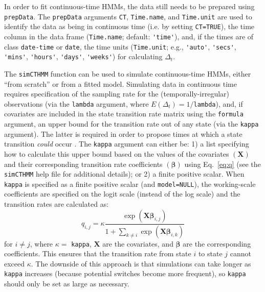 \documentclass[12pt]{article}\usepackage[]{graphicx}\usepackage[]{xcolor}
\begin{document}
In order to fit continuous-time HMMs, the data still needs to be prepared using \verb|prepData|. The \verb|prepData| arguments \verb|CT|, \verb|Time.name|, and \verb|Time.unit| are used to identify the data as being in continuous time (i.e. by setting \verb|CT=TRUE|), the time column in the data frame (\verb|Time.name|; default: \verb|'time'|), and, if the times are of class \verb|date-time| or \verb|date|, the time units (\verb|Time.unit|; e.g., \verb|'auto'|, \verb|'secs'|, \verb|'mins'|, \verb|'hours'|, \verb|'days'|, \verb|'weeks'|) for calculating $\Delta_t$.

The \verb|simCTHMM| function can be used to simulate continuous-time HMMs, either ``from scratch'' or from a fitted model. Simulating data in continuous time requires specification of the sampling rate for the (temporally-irregular) observations (via the \verb|lambda| argument, where $E(\Delta_t)=1/$\verb|lambda|), and, if covariates are included in the state transition rate matrix using the \verb|formula| argument, an upper bound for the transition rate out of any state (via the \verb|kappa| argument). The latter is required in order to propose times at which a state transition {\it could} occur \citep[][]{BlackwellEtAl2016,McClintockLander2024}. The \verb|kappa| argument can either be: 1) a list specifying how to calculate this upper bound based on the values of the covariates $(\mathbf{X})$ and their corresponding transition rate coefficients $(\boldsymbol{\beta})$ using Eq.\ \ref{eq:q} (see the \verb|simCTHMM| help file for additional details); or 2) a finite positive scalar. When \verb|kappa| is specified as a finite positive scalar (and \verb|model=NULL|), the working-scale coefficients are specified on the logit scale (instead of the log scale) and the transition rates are calculated as:
\begin{equation}
\label{eq:kappa}
 q_{i,j} = \kappa \frac{\exp(\mathbf{X}\boldsymbol{\beta}_{i,j})}{1+\sum_{k \ne i}\exp(\mathbf{X}\boldsymbol{\beta}_{i,k})}
\end{equation}
for $i \ne j$, where $\kappa=$ \verb|kappa|, $\mathbf{X}$ are the covariates, and $\boldsymbol{\beta}$ are the corresponding coefficients. This ensures that the transition rate from state $i$ to state $j$ cannot exceed $\kappa$. The downside of this approach is that simulations can take longer as \verb|kappa| increases (because potential switches become more frequent), so \verb|kappa| should only be set as large as necessary.
\end{document}
